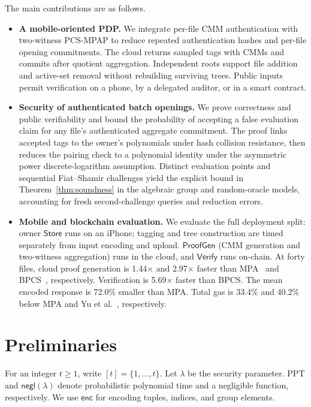 \documentclass[lettersize,journal]{IEEEtran}
\newcommand{\Store}{\ensuremath{\mathsf{Store}}}
\newcommand{\ProofGen}{\ensuremath{\mathsf{ProofGen}}}
\newcommand{\Verify}{\ensuremath{\mathsf{Verify}}}
\begin{document}
The main contributions are as follows.
\begin{itemize}
\item \textbf{A mobile-oriented PDP.} We integrate per-file CMM authentication with two-witness PCS-MPAP to reduce repeated authentication hashes and per-file opening commitments. The cloud returns sampled tags with CMMs and commits after quotient aggregation. Independent roots support file addition and active-set removal without rebuilding surviving trees. Public inputs permit verification on a phone, by a delegated auditor, or in a smart contract.

\item \textbf{Security of authenticated batch openings.} We prove correctness and public verifiability and bound the probability of accepting a false evaluation claim for any file's authenticated aggregate commitment. The proof links accepted tags to the owner's polynomials under hash collision resistance, then reduces the pairing check to a polynomial identity under the asymmetric power discrete-logarithm assumption. Distinct evaluation points and sequential Fiat--Shamir challenges yield the explicit bound in Theorem~\ref{thm:soundness} in the algebraic group and random-oracle models, accounting for fresh second-challenge queries and reduction errors.

\item \textbf{Mobile and blockchain evaluation.} We evaluate the full deployment split: owner \Store{} runs on an iPhone; tagging and tree construction are timed separately from input encoding and upload. \ProofGen{} (CMM generation and two-witness aggregation) runs in the cloud, and \Verify{} runs on-chain. At forty files, cloud proof generation is 1.44$\times$ and 2.97$\times$ faster than MPA~\cite{XuTIFS26} and BPCS~\cite{ZhangTPDS23}, respectively. Verification is 5.69$\times$ faster than BPCS. The mean encoded response is 72.0\% smaller than MPA. Total gas is 33.4\% and 40.2\% below MPA and Yu et al.~\cite{YuTC25}, respectively.
\end{itemize}

\section{Preliminaries}
\label{sec:preliminaries}
For an integer $t\geq1$, write $[t]=\{1,\ldots,t\}$. Let $\lambda$ be the security parameter. PPT and $\mathsf{negl}(\lambda)$ denote probabilistic polynomial time and a negligible function, respectively. We use $\mathsf{enc}$ for encoding tuples, indices, and group elements.
\end{document}
